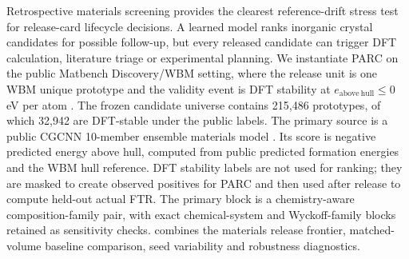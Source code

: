 \documentclass[10pt,twocolumn]{article}
\begin{document}
Retrospective materials screening provides the clearest reference-drift stress test for release-card lifecycle decisions.
A learned model ranks inorganic crystal candidates for possible follow-up, but every released candidate can trigger DFT calculation, literature triage or experimental planning.
We instantiate PARC on the public Matbench Discovery/WBM setting, where the release unit is one WBM unique prototype and the validity event is DFT stability at \(e_{\mathrm{above\ hull}}\le 0\) eV per atom \cite{riebesell2025framework}.
The frozen candidate universe contains 215,486 prototypes, of which 32,942 are DFT-stable under the public labels.
The primary source is a public CGCNN 10-member ensemble materials model \cite{xie2018crystal}.
Its score is negative predicted energy above hull, computed from public predicted formation energies and the WBM hull reference.
DFT stability labels are not used for ranking; they are masked to create observed positives for PARC and then used after release to compute held-out actual FTR.
The primary block is a chemistry-aware composition-family pair, with exact chemical-system and Wyckoff-family blocks retained as sensitivity checks.
 combines the materials release frontier, matched-volume baseline comparison, seed variability and robustness diagnostics.
\end{document}
